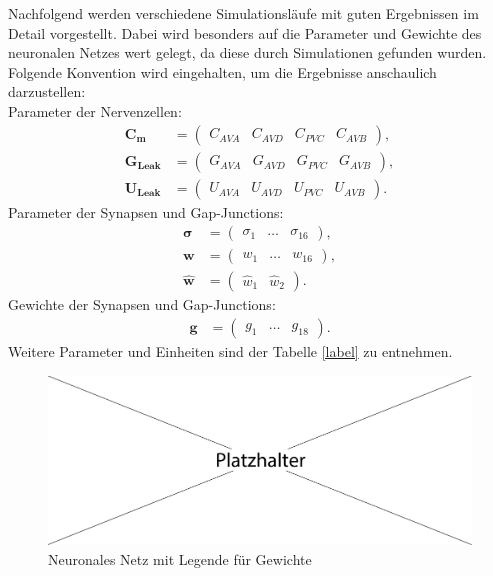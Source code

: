 	Nachfolgend werden verschiedene Simulationsläufe mit guten Ergebnissen im Detail vorgestellt. Dabei wird besonders auf die Parameter und Gewichte des neuronalen Netzes wert gelegt, da diese durch Simulationen gefunden wurden.\\
	Folgende Konvention wird eingehalten, um die Ergebnisse anschaulich darzustellen:\\
	Parameter der Nervenzellen:
	\begin{align}
		\boldsymbol{C_m} &= \begin{pmatrix}C_{AVA} & C_{AVD} & C_{PVC} & C_{AVB}\end{pmatrix},\\
		\boldsymbol{G_{Leak}} &= \begin{pmatrix}G_{AVA} & G_{AVD} & G_{PVC} & G_{AVB}\end{pmatrix},\\
		\boldsymbol{U_{Leak}} &= \begin{pmatrix}U_{AVA} & U_{AVD} & U_{PVC} & U_{AVB}\end{pmatrix}.
	\end{align}
	Parameter der Synapsen und Gap-Junctions:
	\begin{align}
		\boldsymbol{\sigma} &= \begin{pmatrix}\sigma_1 & \dots & \sigma_{16}\end{pmatrix},\\
		\boldsymbol{w} &= \begin{pmatrix}w_1 & \dots & w_{16}\end{pmatrix},\\
		\boldsymbol{\hat{w}} &= \begin{pmatrix}\hat{w}_1 & \hat{w}_{2}\end{pmatrix}.
	\end{align}
	Gewichte der Synapsen und Gap-Junctions:
	\begin{align}
		\boldsymbol{g} &= \begin{pmatrix}g_1 & \dots & g_{18}\end{pmatrix}.
	\end{align}
	Weitere Parameter und Einheiten sind der Tabelle \ref{label} zu entnehmen.
	\begin{figure}[!h] %
		\centering
		\includegraphics[width=12cm]{figures/sonstiges/platzhalter.pdf}
		\caption{Neuronales Netz mit Legende für Gewichte}
		\label{fig:erg_rs_flow}
	\end{figure}

